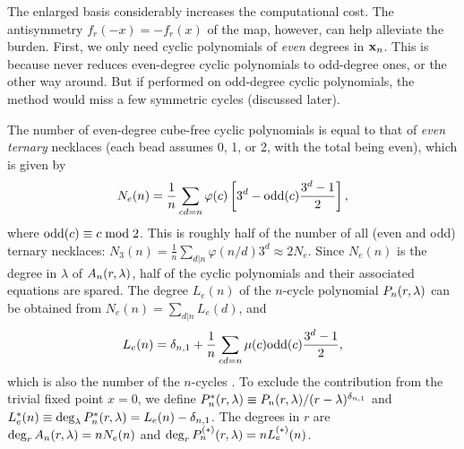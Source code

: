 \documentclass{ws-ijbc}
\begin{document}
%
The enlarged basis considerably increases the computational cost.
%
The antisymmetry
  $f_r(-x) = -f_r(x)$
of the map, however, can help alleviate the burden.
%
First, we only need cyclic polynomials
  of \emph{even} %
  degrees in $\mathbf{x}_{n}$.
%
This is because  %
never reduces even-degree cyclic polynomials
to odd-degree ones,
or the other way around.
%
But if performed on odd-degree cyclic polynomials,
  the method would miss a few symmetric cycles (discussed later).
%







The number of even-degree cube-free cyclic polynomials
is equal to that of \emph{even ternary} necklaces
(each bead assumes 0, 1, or 2, with the total being even),
which is given by
%
\begin{equation}
  N_e(n) = \frac{1}{n} \sum_{c d = n} \varphi(c)
    \left[
      3^d - \mathrm{odd}(c) \frac{3^d-1}{2}
    \right],
\notag
\end{equation}
where
$\mathrm{odd}(c) \equiv c \bmod 2$.
%
This is roughly half of the number of all (even and odd) ternary necklaces:
$N_3(n) = \frac{1}{n} \sum_{d|n} \varphi(n/d) 3^d \approx 2 N_e$.
%
%
Since $N_e(n)$ is the degree in $\lambda$ of $A_n(r, \lambda)$,
  half of the cyclic polynomials and their associated equations are spared.
%
The degree $L_e(n)$ of the $n$-cycle polynomial $P_n(r, \lambda)$
  can be obtained from
  $N_e(n) = \sum_{d|n} L_e(d)$,
and
%
%
\begin{equation}
  L_e(n) = \delta_{n, 1} +
    \frac{1}{n} \sum_{cd = n} \mu(c) \mathrm{odd}(c)\frac{3^d-1}{2},
\notag
\end{equation}
%
%
%
which is also the number of the $n$-cycles \cite{zeng}.
%
To exclude the contribution from the trivial fixed point $x = 0$,
we define
  $P^*_n(r, \lambda) \equiv P_n(r, \lambda)/(r-\lambda)^{\delta_{n,1}}$
and
  $L^*_e(n) \equiv \deg_\lambda P^*_n(r, \lambda) = L_e(n) - \delta_{n,1}$.
%
%
%
The degrees in $r$ are
  $\deg_r A_n(r, \lambda) = n N_e(n)$
  and
  $\deg_r P^{(*)}_n(r, \lambda) = n L^{(*)}_e(n)$.
\end{document}
